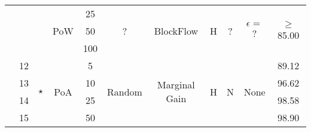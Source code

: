 \begin{landscape}
\begin{table}[]
\begin{tabular}{c|c|c|c|c|c|c|c|c|c|c}
                                                                                            & \multirow{3}{*}{}   & \multirow{3}{*}{\cite{10.48550/arxiv.2007.03856}} & \multirow{3}{*}{PoW}       & 25                       & \multirow{3}{*}{?}      & \multirow{3}{*}{BlockFlow}     & \multirow{3}{*}{H} & \multirow{3}{*}{?} & \multirow{3}{*}{$\epsilon =$ ?} & \multirow{3}{*}{$\geq$ 85.00} \\
                                                                                            &                     &                                            &                            & 50                       &                         &                                &                    &                    &                        &                                        \\
                                                                                            &                     &                                            &                            & 100                      &                         &                                &                    &                    &                        &                                        \\ \hline
                                                                                            & 12                  & \multirow{4}{*}{$\star$}                         & \multirow{4}{*}{PoA}       & 5                        & \multirow{4}{*}{Random} & \multirow{4}{*}{Marginal Gain} & \multirow{4}{*}{H} & \multirow{4}{*}{N} & \multirow{4}{*}{None}  & 89.12                                  \\
                                                                                            & 13                  &                                            &                            & 10                       &                         &                                &                    &                    &                        & 96.62                                  \\
                                                                                            & 14                  &                                            &                            & 25                       &                         &                                &                    &                    &                        & 98.58                                  \\
                                                                                            & 15                  &                                            &                            & 50                       &                         &                                &                    &                    &                        & 98.90                                  \\ \hline

\end{tabular}
\end{table}
\end{landscape}
